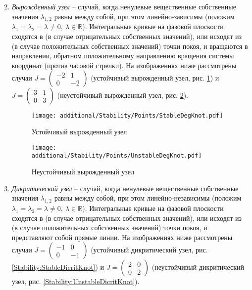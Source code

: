 \begin{enumerate}
\begin{multicols}{2}
			\end{multicols}

		\item \textit{Вырожденный узел} -- случай, когда ненулевые вещественные собственные значения $\lambda_{1, 2}$ равны между собой, при этом линейно-зависимы (положим $\lambda_1 = \lambda_2 = \lambda \neq 0, ~ \lambda \in \mathbb{R}$). Интегральные кривые на фазовой плоскости сходятся в (в случае отрицательных собственных значений), или исходят из (в случае положительных собственных значений) точки покоя, и вращаются в направлении, обратном положительному направлению вращения системы координат (против часовой стрелки). На изображениях ниже рассмотрены случаи $J = \begin{pmatrix} -2 & 1 \\ 0 & -2 \end{pmatrix}$ (устойчивый вырожденный узел, рис. \ref{Stability:StableDegKnot}) и $J = \begin{pmatrix} 3 & 1 \\ 0 & 3 \end{pmatrix}$ (неустойчивый вырожденный узел, рис. \ref{Stability:UnstableDegKnot}).

			\begin{multicols}{2}

				\begin{figure}[H]
					\centering
					\texttt{[image: additional/Stability/Points/StableDegKnot.pdf]}
					\caption{Устойчивый вырожденный узел}
					\label{Stability:StableDegKnot}
				\end{figure}

			\columnbreak

				\begin{figure}[H]
					\centering
					\texttt{[image: additional/Stability/Points/UnstableDegKnot.pdf]}
					\caption{Неустойчивый вырожденный узел}
					\label{Stability:UnstableDegKnot}
				\end{figure}

			\end{multicols}

		\item \textit{Дикритический узел} -- случай, когда ненулевые вещественные собственные значения $\lambda_{1, 2}$ равны между собой, при этом линейно-независимы (положим $\lambda_1 = \lambda_2 = \lambda \neq 0, ~ \lambda \in \mathbb{R}$). Интегральные кривые на фазовой плоскости сходятся в (в случае отрицательных собственных значений), или исходят из (в случае положительных собственных значений) точки покоя, и представляют собой прямые линии. На изображениях ниже рассмотрены случаи $J = \begin{pmatrix} -1 & 0 \\ 0 & -1 \end{pmatrix}$ (устойчивый дикритический узел, рис. \ref{Stability:StableDicritKnot}) и $J = \begin{pmatrix} 2 & 0 \\ 0 & 2 \end{pmatrix}$ (неустойчивый дикритический узел, рис. \ref{Stability:UnstableDicritKnot}).


\end{enumerate}
